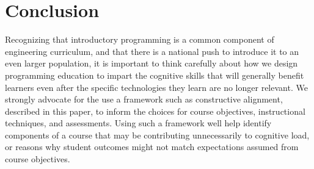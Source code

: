 \documentclass[12pt]{article}
\let\textcite=\autocite
\begin{document}
\section{Conclusion}

Recognizing that introductory programming is a common component of
engineering curriculum, and that there is a national push to introduce
it to an even larger population, it is important to think carefully
about how we design programming education to impart the cognitive
skills that will generally benefit learners even after the specific
technologies they learn are no longer relevant. We strongly advocate
for the use a framework such as constructive alignment, described in
this paper, to inform the choices for course objectives, instructional
techniques, and assessments. Using such a framework well help identify
components of a course that may be contributing unnecessarily to
cognitive load, or reasons why student outcomes might not match
expectations assumed from course objectives.


\end{document}
